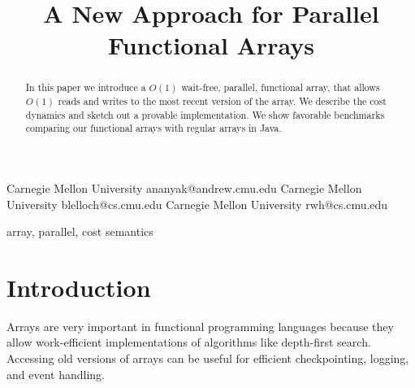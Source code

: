 \documentclass[preprint]{sigplanconf}
\begin{document}
\setlength{\pdfpageheight}{\paperheight}
\setlength{\pdfpagewidth}{\paperwidth}




\title{A New Approach for Parallel Functional Arrays}

           {Carnegie Mellon University}
           {ananyak@andrew.cmu.edu}
           {Carnegie Mellon University}
           {blelloch@cs.cmu.edu}
           {Carnegie Mellon University}
           {rwh@cs.cmu.edu}
\maketitle

\newtheorem{theorem}{Theorem}[section]
\newtheorem{corollary}{Corollary}[theorem]
\newtheorem{lemma}[theorem]{Lemma}
\theoremstyle{definition}
\newtheorem{definition}{Definition}[section]

\begin{abstract}
In this paper we introduce a $O(1)$ wait-free, parallel, functional array, that allows $O(1)$ reads and writes to the most recent version of the array. We describe the cost dynamics and sketch out a provable implementation. We show favorable benchmarks comparing our functional arrays with regular arrays in Java.
\end{abstract}


\keywords
array, parallel, cost semantics

\section{Introduction}

Arrays are very important in functional programming languages because they allow work-efficient implementations of algorithms like depth-first search. Accessing old versions of arrays can be useful for efficient checkpointing, logging, and event handling.
\end{document}
